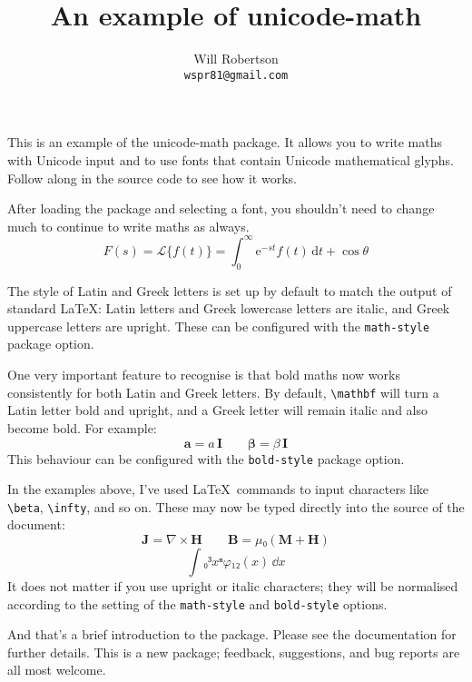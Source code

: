 \documentclass{article}
\begin{document}
\title{An example of \textsf{unicode-math}}
\author{Will Robertson\\\texttt{wspr81@gmail.com}}
\maketitle

This is an example of the \textsf{unicode-math} package.
It allows you to write maths with Unicode input and to use fonts that contain Unicode mathematical glyphs. Follow along in the source code to see how it works.

After loading the package and selecting a font, you shouldn't need to change much to continue to write maths as always.
\[
   F(s)=\mathscr L \{f(t)\}=\int_0^\infty \mathrm e^{-st}f(t)\,\mathrm d t + \cos \theta
\]

The style of Latin and Greek letters is set up by default to match the output of standard \LaTeX: Latin letters and Greek lowercase letters are italic, and Greek uppercase letters are upright. These can be configured with the \texttt{math-style} package option.

One very important feature to recognise is that bold maths now works consistently for both Latin and Greek letters. By default, \verb|\mathbf| will turn a Latin letter bold and upright, and a Greek letter will remain italic and also become bold. For example:
\[
  \mathbf{a} = a\,\mathbf{I} \qquad \mathbf{\beta} = \beta\,\mathbf{I}
\]
This behaviour can be configured with the \texttt{bold-style} package option.

In the examples above, I've used \LaTeX\ commands to input characters like \verb|\beta|, \verb|\infty|, and so on. These may now be typed directly into the source of the document:
\[
   𝐉 = ∇×𝐇 \qquad 𝐁 = μ₀(𝐌 + 𝐇)
\]
\[
  ∫₀³ xⁿφ₁₂(x)\,ⅆx
\]
It does not matter if you use upright or italic characters; they will be normalised according to the setting of the \texttt{math-style} and \texttt{bold-style} options.

And that's a brief introduction to the package. Please see the documentation for further details. This is a new package; feedback, suggestions, and bug reports are all most welcome.
\end{document}
